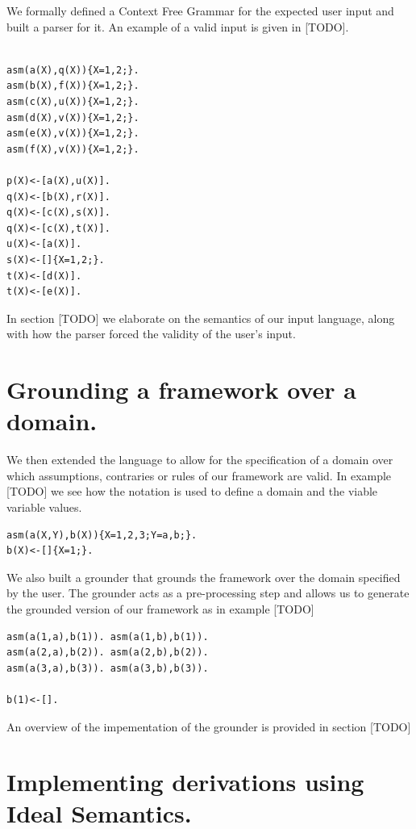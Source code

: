 We formally defined a Context Free Grammar for the expected user input and built a parser for it. An example of a valid input is given in [TODO].

\begin{Verbatim}[frame=single]

asm(a(X),q(X)){X=1,2;}.
asm(b(X),f(X)){X=1,2;}.
asm(c(X),u(X)){X=1,2;}.
asm(d(X),v(X)){X=1,2;}.
asm(e(X),v(X)){X=1,2;}.
asm(f(X),v(X)){X=1,2;}.

p(X)<-[a(X),u(X)].
q(X)<-[b(X),r(X)].
q(X)<-[c(X),s(X)].
q(X)<-[c(X),t(X)].
u(X)<-[a(X)].
s(X)<-[]{X=1,2;}.
t(X)<-[d(X)].
t(X)<-[e(X)].

\end{Verbatim}

In section [TODO] we elaborate on the semantics of our input language, along with how the parser forced the validity of the user's input.

\section{Grounding a framework over a domain.}

We then extended the language to allow for the specification of a domain over which assumptions, contraries or rules of our framework are valid. In example [TODO] we see how the notation is used to define a domain and the viable variable values.

\begin{Verbatim}[frame=single]
asm(a(X,Y),b(X)){X=1,2,3;Y=a,b;}.
b(X)<-[]{X=1;}.
\end{Verbatim}

We also built a grounder that grounds the framework over the domain specified by the user. The grounder acts as a pre-processing step and allows us to generate the grounded version of our framework as in example [TODO]

\begin{Verbatim}[frame=single]
asm(a(1,a),b(1)). asm(a(1,b),b(1)).
asm(a(2,a),b(2)). asm(a(2,b),b(2)).
asm(a(3,a),b(3)). asm(a(3,b),b(3)).

b(1)<-[].
\end{Verbatim}

An overview of the impementation of the grounder is provided in section [TODO]

\section{Implementing derivations using Ideal Semantics.}

